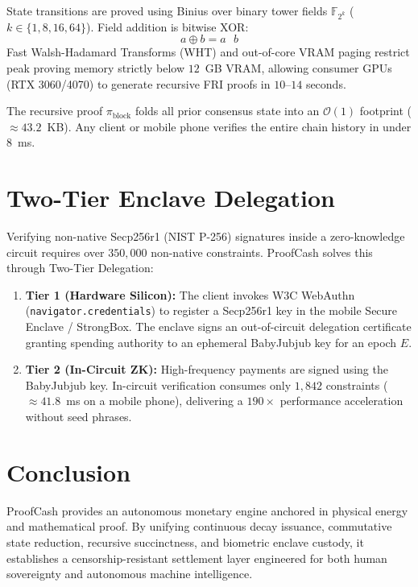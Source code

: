 \documentclass[10pt,conference,letterpaper]{IEEEtran}
\begin{document}
State transitions are proved using Binius over binary tower fields $\mathbb{F}_{2^k}$ ($k \in \{1, 8, 16, 64\}$). Field addition is bitwise XOR:
\begin{equation}
a \oplus b = a \text{ \^{} } b
\end{equation}
Fast Walsh-Hadamard Transforms (WHT) and out-of-core VRAM paging restrict peak proving memory strictly below $12$~GB VRAM, allowing consumer GPUs (RTX 3060/4070) to generate recursive FRI proofs in $10\text{--}14$ seconds.

The recursive proof $\pi_{\text{block}}$ folds all prior consensus state into an $\mathcal{O}(1)$ footprint ($\approx 43.2$~KB). Any client or mobile phone verifies the entire chain history in under $8$~ms.

\section{Two-Tier Enclave Delegation}
Verifying non-native Secp256r1 (NIST P-256) signatures inside a zero-knowledge circuit requires over $350{,}000$ non-native constraints. ProofCash solves this through Two-Tier Delegation:

\begin{enumerate}
    \item \textbf{Tier 1 (Hardware Silicon):} The client invokes W3C WebAuthn (\texttt{navigator.credentials}) to register a Secp256r1 key in the mobile Secure Enclave / StrongBox. The enclave signs an out-of-circuit delegation certificate granting spending authority to an ephemeral BabyJubjub key for an epoch $E$.
    \item \textbf{Tier 2 (In-Circuit ZK):} High-frequency payments are signed using the BabyJubjub key. In-circuit verification consumes only $1{,}842$ constraints ($\approx 41.8$~ms on a mobile phone), delivering a $190\times$ performance acceleration without seed phrases.
\end{enumerate}

\section{Conclusion}
ProofCash provides an autonomous monetary engine anchored in physical energy and mathematical proof. By unifying continuous decay issuance, commutative state reduction, recursive succinctness, and biometric enclave custody, it establishes a censorship-resistant settlement layer engineered for both human sovereignty and autonomous machine intelligence.
\end{document}
